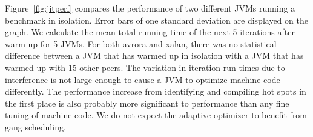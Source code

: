 \documentclass{sig-alternate}
\begin{document}
Figure~\ref{fig:jitperf} compares the performance of two different JVMs running a benchmark in isolation. Error bars of one standard deviation are displayed on the graph. We calculate the mean total running time of the next 5 iterations after warm up for 5 JVMs. For both avrora and xalan, there was no statistical difference between a JVM that has warmed up in isolation with a JVM that has warmed up with 15 other peers. The variation in iteration run times due to interference is not large enough to cause a JVM to optimize machine code differently. The performance increase from identifying and compiling hot spots in the first place is also probably more significant to performance than any fine tuning of machine code. We do not expect the adaptive optimizer to benefit from gang scheduling.


%
%


\end{document}
